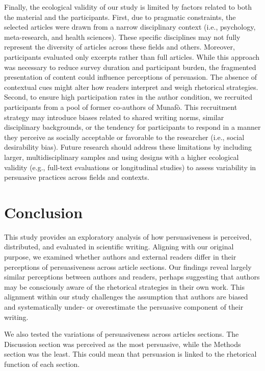 \documentclass[authordate, meta]{jote-new-article}
\begin{document}
	Finally, the ecological validity of our study is limited by factors related to both the material and the participants. First, due to pragmatic constraints, the selected articles were drawn from a narrow disciplinary context (i.e., psychology, meta-research, and health sciences). These specific disciplines may not fully represent the diversity of articles across these fields and others. Moreover, participants evaluated only excerpts rather than full articles. While this approach was necessary to reduce survey duration and participant burden, the fragmented presentation of content could influence perceptions of persuasion. The absence of contextual cues might alter how readers interpret and weigh rhetorical strategies. Second, to ensure high participation rates in the author condition, we recruited participants from a pool of former co-authors of Munafò. This recruitment strategy may introduce biases related to shared writing norms, similar disciplinary backgrounds, or the tendency for participants to respond in a manner they perceive as socially acceptable or favorable to the researcher (i.e., social desirability bias). Future research should address these limitations by including larger, multidisciplinary samples and using designs with a higher ecological validity (e.g., full-text evaluations or longitudinal studies) to assess variability in persuasive practices across fields and contexts.



	\section{Conclusion}



	This study provides an exploratory analysis of how persuasiveness is perceived, distributed, and evaluated in scientific writing. Aligning with our original purpose, we examined whether authors and external readers differ in their perceptions of persuasiveness across article sections. Our findings reveal largely similar perceptions between authors and readers, perhaps suggesting that authors may be consciously aware of the rhetorical strategies in their own work. This alignment within our study challenges the assumption that authors are biased and systematically under- or overestimate the persuasive component of their writing.



	We also tested the variations of persuasiveness across articles sections. The Discussion section was perceived as the most persuasive, while the Methods section was the least. This could mean that persuasion is linked to the rhetorical function of each section.
\end{document}
